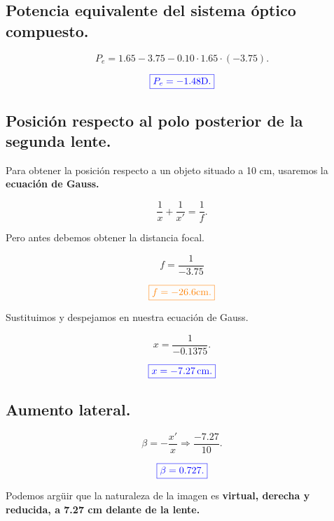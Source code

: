 \documentclass[a4paper,12pt]{article} %
\begin{document}
\vspace{\baselineskip}

\subsection{Potencia equivalente del sistema óptico compuesto.}

\[P_e = 1.65 - 3.75 - 0.10 \cdot 1.65 \cdot \left(-3.75\right).\]

\[\textcolor{blue}{\boxed{P_e = -1.48 \mathrm{D}.}}\]

\vspace{\baselineskip}

\subsection{Posición respecto al polo posterior de la segunda lente.}

\begin{justify}
	Para obtener la posición respecto a un objeto situado a 10 cm, usaremos la \textbf{ecuación de Gauss.}
\end{justify}

\[ \frac{1}{x} + \frac{1}{x'} = \frac{1}{f}. \]

\begin{justify}
	Pero antes debemos obtener la distancia focal.
\end{justify}

\[ f = \frac{1}{-3.75}\]

\[\textcolor{orange}{\boxed{f = -26.6 \mathrm{cm}.}}\]

\begin{justify}
	Sustituimos y despejamos en nuestra ecuación de Gauss.
\end{justify}

\[x = \frac{1}{-0.1375}.\]

\[\textcolor{blue}{\boxed{x = -7.27 \, \mathrm{cm}.}}\]

\vspace{\baselineskip}

\subsection{Aumento lateral.}

\[\beta = -\frac{x'}{x} \Rightarrow \frac{-7.27}{10}.\]

\[\textcolor{blue}{\boxed{\beta = 0.727.}}\]

\begin{justify}
	Podemos argüir que la naturaleza de la imagen es \textbf{virtual, derecha y reducida, a 7.27 cm delante de la lente.}
\end{justify}
\vspace{\baselineskip}
\end{document}
